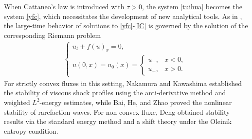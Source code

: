 \documentclass[10pt,reqno]{amsart}
\numberwithin{equation}{section}
\begin{document}
		
		When Cattaneo’s law is introduced with $\tau>0$, the system \eqref{tuihua} becomes the system \eqref{yfc}, which necessitates the development of new analytical tools. As in \cite{ref3}, the large-time behavior of solutions to \eqref{yfc}-\eqref{IC} is governed by the solution of the corresponding Riemann problem
		\begin{align*}
			\begin{cases}
				u_t + f(u)_x = 0, \\
				u(0, x) = u_0(x) = \begin{cases}
					u_-, & x < 0, \\
					u_+, & x > 0.
				\end{cases}
			\end{cases}
		\end{align*}
		For strictly convex fluxes in this setting, Nakamura and Kawashima \cite{ref5} established the stability of viscous shock profiles using the anti-derivative method and weighted $L^2$-energy estimates, while Bai, He, and Zhao \cite{ref8} proved the nonlinear stability of rarefaction waves. For non-convex fluxe, Deng \cite{ref3} obtained stability results via the standard energy method and a shift theory under the Oleinik entropy condition.
		
\end{document}
